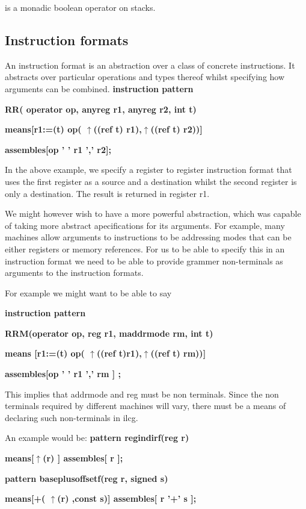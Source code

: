 {{is a monadic boolean operator on stacks. 


\subsection{Instruction formats}

An instruction format is an abstraction over a class of concrete instructions.
It abstracts over particular operations and types thereof whilst specifying
how arguments can be combined. \textbf{instruction pattern}

\textbf{RR( operator op, anyreg r1, anyreg r2, int t)}

\textbf{means{[}r1:=(t) op( $\uparrow $((ref t) r1),$\uparrow $((ref
t) r2)){]}}

\textbf{assembles{[}op ' ' r1 ',' r2{]};}

In the above example, we specify a register to register instruction
format that uses the first register as a source and a destination
whilst the second register is only a destination. The result is returned
in register r1.

We might however wish to have a more powerful abstraction, which was
capable of taking more abstract apecifications for its arguments.
For example, many machines allow arguments to instructions to be addressing
modes that can be either registers or memory references. For us to
be able to specify this in an instruction format we need to be able
to provide grammer non-terminals as arguments to the instruction formats.

For example we might want to be able to say

\textbf{instruction pattern}

\textbf{RRM(operator op, reg r1, maddrmode rm, int t)}

\textbf{means {[}r1:=(t) op( $\uparrow $((ref t)r1),$\uparrow $((ref
t) rm)){]}}

\textbf{assembles{[}op ' ' r1 ',' rm {]} ;}

This implies that addrmode and reg must be non terminals. Since the
non terminals required by different machines will vary, there must
be a means of declaring such non-terminals in ilcg.

An example would be:   \textbf{pattern regindirf(reg r)}

\textbf{means{[}$\uparrow $(r) {]} assembles{[} r {]};}

\textbf{pattern baseplusoffsetf(reg r, signed s)}

\textbf{means{[}+( $\uparrow $(r) ,const s){]} assembles{[} r '+'
s {]};}

}}
